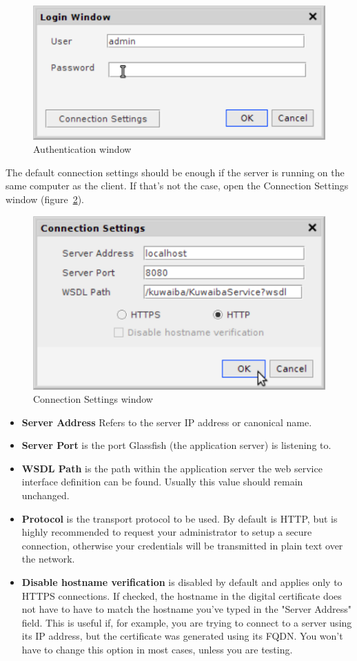 \documentclass[a4paper]{article}
\begin{document}
	\begin{figure}[h!]
		\centering
		\includegraphics[width=0.5\linewidth]{img/auth_window.png}
		\caption{Authentication window}
		\label{fig:auth_window}
	\end{figure}
	The default connection settings should be enough if the server is running on the same computer  as the client. If that's not the case, open the Connection Settings window (figure~\ref{fig:connection_settings}).
	\begin{figure}[h!]
		\centering
		\includegraphics[width=0.5\linewidth]{img/connection_settings.png}
		\caption{Connection Settings window}
		\label{fig:connection_settings}
	\end{figure}
	\begin{itemize}
		\item \textbf{Server Address} Refers to the server IP address or canonical name.
		\item \textbf{Server Port} is the port Glassfish (the application server) is listening to.
		\item \textbf{WSDL Path} is the path within the application server the web service interface definition can be found. Usually this value should remain unchanged.
		\item \textbf{Protocol} is the transport protocol to be used. By default is HTTP, but is highly recommended to request your administrator to setup a secure connection, otherwise your credentials will be transmitted in plain text over the network.
		\item \textbf{Disable hostname verification} is disabled by default and applies only to HTTPS connections. If checked, the hostname in the digital certificate does not have to have to match the hostname you've typed in the "Server Address" field. This is useful if, for example, you are trying to connect to a server using its IP address, but the certificate was generated using its FQDN. You won't have to change this option in most cases, unless you are testing.
	\end{itemize}
\end{document}
